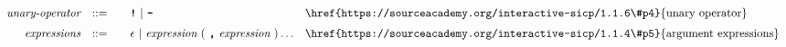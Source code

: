 \begin{alignat*}{9}
&& \textit{unary-operator}    
                        && ::= &\quad && \textbf{\texttt{!}}\ |\ \textbf{\texttt{-}}
                        && \textrm{\href{https://sourceacademy.org/interactive-sicp/1.1.6\#p4}{unary operator}}\\[1mm]
&& \textit{expressions}  && ::= &\quad && \epsilon\ | \ \textit{expression}\ (
                                                               \ \textbf{\texttt{,}} \
                                                                 \textit{expression} \ 
                                                                      ) \ldots
                                                            && \textrm{\href{https://sourceacademy.org/interactive-sicp/1.1.4\#p5}{argument expressions}} 
\end{alignat*}
